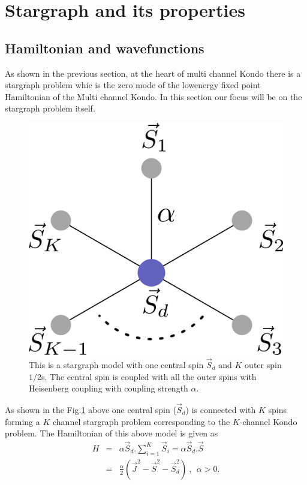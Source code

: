 \documentclass[reprint,prb,superscriptaddress]{revtex4-1}
\begin{document}
\tableofcontents

\section{Stargraph and its properties}
\subsection{Hamiltonian and wavefunctions}
\noindent As shown in the previous section, at the heart of multi channel Kondo there is a stargraph problem whic is the zero mode of the lowenergy fixed point Hamiltonian of the Multi channel Kondo. In this section our focus will be on the stargraph problem itself.
\begin{figure}[!h]
\centering
\includegraphics[scale=0.4]{plt/stargraph_first}
\caption{This is a stargraph model with one central spin $\vec{S}_d$ and $K$ outer spin $1/2$s. The central spin is coupled with all the outer spins with Heisenberg coupling with coupling strength $\alpha$.}
\label{fig:stargraph_first}
\end{figure}
As shown in the Fig.\ref{fig:stargraph_first} above one central spin ($\vec{S}_d$) is connected with $K$ spins forming a $K$ channel stargraph problem corresponding to the $K$-channel Kondo problem. The Hamiltonian of this above model is given as 
\begin{eqnarray}
H &=& \alpha \vec{S}_d.\sum_{i=1}^{K}\vec{S}_i=\alpha \vec{S}_d.\vec{S} \nonumber\\
&=& \frac{\alpha}{2} (\vec{J}^2-\vec{S}^2-\vec{S}_d^2)~,~~\alpha >0.
\label{eq:stargraph_hamiltonian}
\end{eqnarray}
\end{document}
